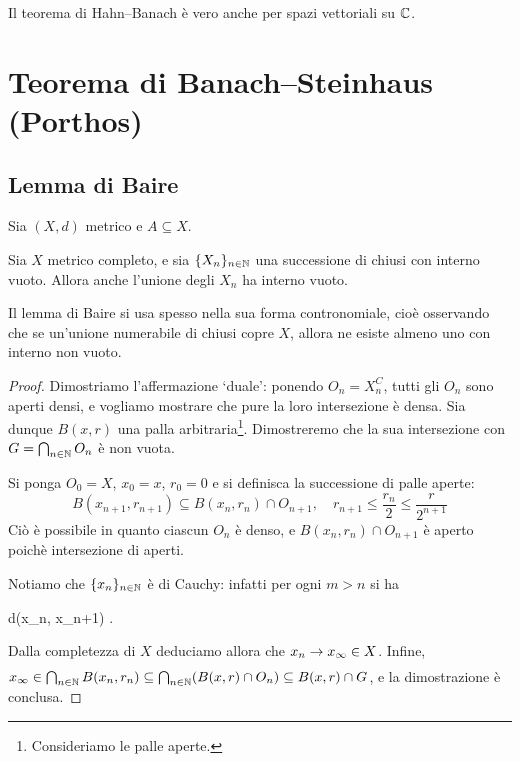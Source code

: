 \begin{remark}
	Il teorema di Hahn--Banach è vero anche per spazi vettoriali su $\mathbb{C}$.%
\end{remark}

\section{Teorema di Banach--Steinhaus (Porthos)}
\subsection{Lemma di Baire}
Sia $(X,d)$ metrico e $A \subseteq X$.

\begin{lemma}[Baire]
\label{lemma:baire}
	Sia $X$ metrico completo, e sia $\{X_n\}_{n \in \mathbb{N}}$ una successione di chiusi con interno vuoto.
	Allora anche l'unione degli $X_n$ ha interno vuoto.
\end{lemma}
\begin{remark}
	Il lemma di Baire si usa spesso nella sua forma contronomiale, cioè osservando che se un'unione numerabile di chiusi copre $X$, allora ne esiste almeno uno con interno non vuoto.
\end{remark}
\begin{proof}
	Dimostriamo l'affermazione `duale': ponendo $O_n = X_n^C$, tutti gli $O_n$ sono aperti densi, e vogliamo mostrare che pure la loro intersezione è densa.
	Sia dunque $B(x,r)$ una palla arbitraria\footnote{Consideriamo le palle aperte.}. Dimostreremo che la sua intersezione con $G = \bigcap_{n \in \mathbb{N}} O_n$ è non vuota.

	Si ponga $O_0 = X$, $x_0 = x$, $r_0 = 0$ e si definisca la successione di palle aperte:
	\begin{equation*}
		B(x_{n+1}, r_{n+1}) \subseteq B(x_n, r_n) \cap O_{n+1}, \quad r_{n+1} \leq \frac{r_n}2 \leq \frac{r}{2^{n+1}}
	\end{equation*}
	Ciò è possibile in quanto ciascun $O_n$ è denso, e $B(x_n, r_n) \cap O_{n+1}$ è aperto poichè intersezione di aperti.

	Notiamo che $\{x_n\}_{n \in \mathbb{N}}$ è di Cauchy: infatti per ogni $m > n$ si ha
	\begin{eqalign*}
		d(x_n, x_{n+1}) \leq {}.
	\end{eqalign*}
	Dalla completezza di $X$ deduciamo allora che $x_n \underset{{}}{\rightarrow} x_\infty \in X$. Infine, $x_\infty \in \bigcap_{n \in \mathbb{N}} B(x_n,r_n) \subseteq \bigcap_{n \in \mathbb{N}} (B(x,r) \cap O_n) \subseteq B(x,r) \cap G$, e la dimostrazione è conclusa.
\end{proof}

